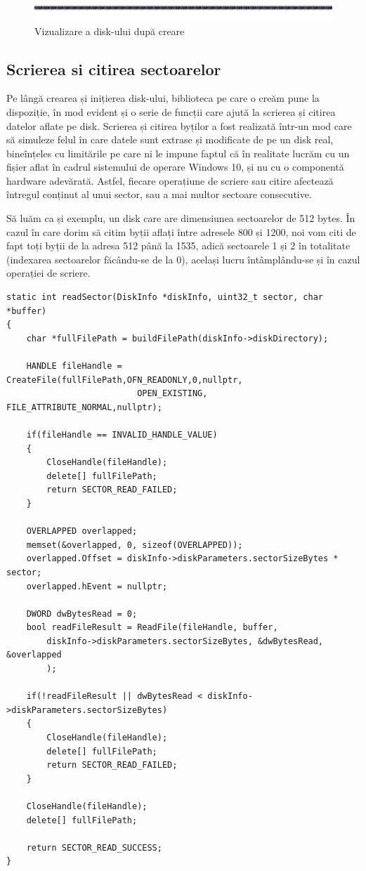 \begin{figure}[h]
    \centering
    \includegraphics[width=1.0\linewidth]{images/2.2.png}
    \caption{Vizualizare a disk-ului după creare}
    \label{fig:enter-label}
\end{figure}


\subsection{Scrierea si citirea sectoarelor}

Pe lângă crearea și inițierea disk-ului, biblioteca pe care o creăm pune la dispoziție, în mod evident și o serie de funcții care ajută la scrierea și citirea datelor aflate pe disk. Scrierea și citirea byților a fost realizată într-un mod care să simuleze felul în care datele sunt extrase și modificate de pe un disk real, bineînțeles cu limitările pe care ni le impune faptul că în realitate lucrăm cu un fișier aflat în cadrul sistemului de operare Windows 10, și nu cu o componentă hardware adevărată. Astfel, fiecare operațiune de scriere sau citire afectează întregul conținut al unui sector, sau a mai multor sectoare consecutive.

Să luăm ca și exemplu, un disk care are dimensiunea sectoarelor de 512 bytes. În cazul în care dorim să citim byții aflați între adresele 800 și 1200, noi vom citi de fapt toți byții de la adresa 512 până la 1535, adică sectoarele 1 și 2 în totalitate (indexarea sectoarelor făcându-se de la 0), același lucru întâmplându-se și în cazul operației de scriere.

\bigskip

\lstset{style=code-snyppet-style}
\begin{lstlisting}
static int readSector(DiskInfo *diskInfo, uint32_t sector, char *buffer)
{
    char *fullFilePath = buildFilePath(diskInfo->diskDirectory);

    HANDLE fileHandle = CreateFile(fullFilePath,OFN_READONLY,0,nullptr,
                          OPEN_EXISTING, FILE_ATTRIBUTE_NORMAL,nullptr);

    if(fileHandle == INVALID_HANDLE_VALUE)
    {
        CloseHandle(fileHandle);
        delete[] fullFilePath;
        return SECTOR_READ_FAILED;
    }

    OVERLAPPED overlapped;
    memset(&overlapped, 0, sizeof(OVERLAPPED));
    overlapped.Offset = diskInfo->diskParameters.sectorSizeBytes * sector;
    overlapped.hEvent = nullptr;

    DWORD dwBytesRead = 0;
    bool readFileResult = ReadFile(fileHandle, buffer, 
        diskInfo->diskParameters.sectorSizeBytes, &dwBytesRead, &overlapped
        );

    if(!readFileResult || dwBytesRead < diskInfo->diskParameters.sectorSizeBytes)
    {
        CloseHandle(fileHandle);
        delete[] fullFilePath;
        return SECTOR_READ_FAILED;
    }

    CloseHandle(fileHandle);
    delete[] fullFilePath;

    return SECTOR_READ_SUCCESS;
}
\end{lstlisting}


